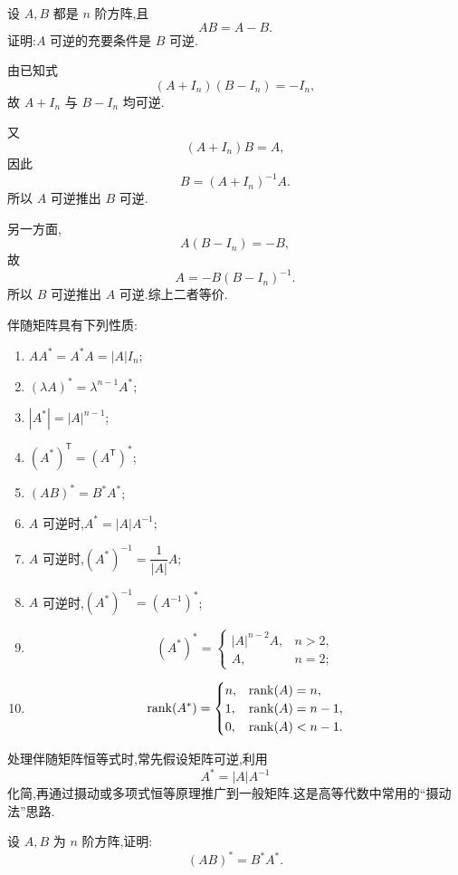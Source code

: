 \begin{example}
设 $A,B$ 都是 $n$ 阶方阵,且
\[
AB=A-B.
\]
证明:$A$ 可逆的充要条件是 $B$ 可逆.
\end{example}
\exampleblank

\begin{solution}
由已知式
\[
(A+I_n)(B-I_n)=-I_n,
\]
故 $A+I_n$ 与 $B-I_n$ 均可逆.

又
\[
(A+I_n)B=A,
\]
因此
\[
B=(A+I_n)^{-1}A.
\]
所以 $A$ 可逆推出 $B$ 可逆.

另一方面,
\[
A(B-I_n)=-B,
\]
故
\[
A=-B(B-I_n)^{-1}.
\]
所以 $B$ 可逆推出 $A$ 可逆.综上二者等价.
\end{solution}

\begin{theorem}[\markstar]
伴随矩阵具有下列性质:
\begin{enumerate}
  \item $AA^*=A^*A=|A|I_n$;
  \item $(\lambda A)^*=\lambda^{n-1}A^*$;
  \item $|A^*|=|A|^{n-1}$;
  \item $(A^*)^{\mathsf T}=(A^{\mathsf T})^*$;
  \item $(AB)^*=B^*A^*$;
  \item $A$ 可逆时,$A^*=|A|A^{-1}$;
  \item $A$ 可逆时,$(A^*)^{-1}=\dfrac{1}{|A|}A$;
  \item $A$ 可逆时,$(A^*)^{-1}=(A^{-1})^*$;
  \item
  \[
  (A^*)^*
  =
  \begin{cases}
  |A|^{n-2}A,&n>2,\\
  A,&n=2;
  \end{cases}
  \]
  \item
  \[
  \operatorname{rank}(A^*)
  =
  \begin{cases}
  n,&\operatorname{rank}(A)=n,\\
  1,&\operatorname{rank}(A)=n-1,\\
  0,&\operatorname{rank}(A)<n-1.
  \end{cases}
  \]
\end{enumerate}
\end{theorem}

\begin{remark}
处理伴随矩阵恒等式时,常先假设矩阵可逆,利用
\[
A^*=|A|A^{-1}
\]
化简,再通过摄动或多项式恒等原理推广到一般矩阵.这是高等代数中常用的``摄动法''思路.
\end{remark}

\begin{example}
设 $A,B$ 为 $n$ 阶方阵,证明:
\[
(AB)^*=B^*A^*.
\]
\end{example}
\exampleblank

